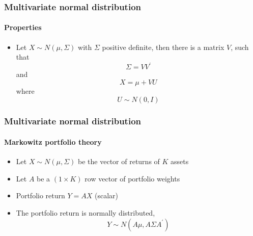 \documentclass[notes=show]{beamer}
\begin{document}
\begin{frame}\frametitle{Multivariate normal distribution}\framesubtitle{Properties}
\begin{itemize}
    \item Let $X\sim N\left( \mu ,\Sigma \right) $ with $\Sigma $ positive definite, then there is a matrix $V$, such that
        \begin{equation*}
            \Sigma =VV^{\prime }
        \end{equation*}
        and
        \begin{equation*}
            X=\mu +VU
        \end{equation*}
        where
        \begin{equation*}
            U\sim N\left( 0,I\right)
        \end{equation*}
\end{itemize}
\end{frame}


\begin{frame}\frametitle{Multivariate normal distribution}\framesubtitle{Markowitz portfolio theory}
\begin{itemize}
    \item Let $X\sim N\left( \mu ,\Sigma \right) $ be the vector of returns of $K $ assets
    \item Let $A$ be a $\left( 1\times K\right) $ row vector of portfolio weights
    \item Portfolio return $Y=AX$ (scalar)
    \item The portfolio return is normally distributed,
        \begin{equation*}
            Y\sim N\left( A\mu ,A\Sigma A^{\prime }\right)
        \end{equation*}
\end{itemize}
\end{frame}
\end{document}
